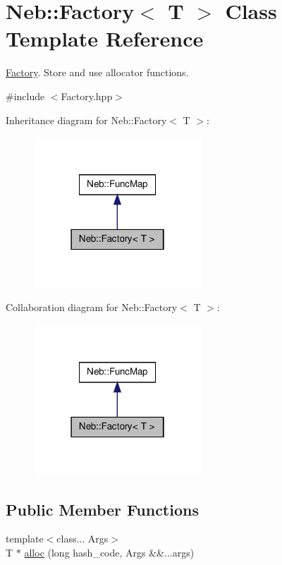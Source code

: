 \hypertarget{classNeb_1_1Factory}{\section{\-Neb\-:\-:\-Factory$<$ \-T $>$ \-Class \-Template \-Reference}
\label{classNeb_1_1Factory}
}


\hyperlink{classNeb_1_1Factory}{\-Factory}. \-Store and use allocator functions.  




{\ttfamily \#include $<$\-Factory.\-hpp$>$}



\-Inheritance diagram for \-Neb\-:\-:\-Factory$<$ \-T $>$\-:\nopagebreak
\begin{figure}[H]
\begin{center}
\leavevmode
\includegraphics[width=178pt]{classNeb_1_1Factory__inherit__graph}
\end{center}
\end{figure}


\-Collaboration diagram for \-Neb\-:\-:\-Factory$<$ \-T $>$\-:\nopagebreak
\begin{figure}[H]
\begin{center}
\leavevmode
\includegraphics[width=178pt]{classNeb_1_1Factory__coll__graph}
\end{center}
\end{figure}
\subsection*{\-Public \-Member \-Functions}
\begin{DoxyCompactItemize}
\item 
{\footnotesize template$<$class... \-Args$>$ }\\\-T $\ast$ \hyperlink{classNeb_1_1Factory_ac499b39e795c35e0894811b2706d5c74}{alloc} (long hash\-\_\-code, \-Args \&\&...args)
\end{DoxyCompactItemize}


